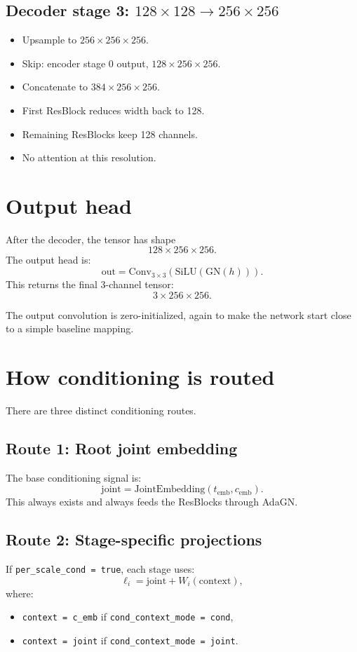 \documentclass[11pt]{article}
\begin{document}
\subsection{Decoder stage 3: $128 \times 128 \to 256 \times 256$}
\begin{itemize}
  \item Upsample to $256 \times 256 \times 256$.
  \item Skip: encoder stage 0 output, $128 \times 256 \times 256$.
  \item Concatenate to $384 \times 256 \times 256$.
  \item First ResBlock reduces width back to 128.
  \item Remaining ResBlocks keep 128 channels.
  \item No attention at this resolution.
\end{itemize}

\section{Output head}
After the decoder, the tensor has shape
\[
128 \times 256 \times 256.
\]
The output head is:
\[
\mathrm{out} = \mathrm{Conv}_{3 \times 3}(\mathrm{SiLU}(\mathrm{GN}(h))).
\]
This returns the final 3-channel tensor:
\[
3 \times 256 \times 256.
\]

The output convolution is zero-initialized, again to make the network start close to a simple baseline mapping.

\section{How conditioning is routed}
There are three distinct conditioning routes.

\subsection{Route 1: Root joint embedding}
The base conditioning signal is:
\[
\mathrm{joint} = \mathrm{JointEmbedding}(t_{\mathrm{emb}}, c_{\mathrm{emb}}).
\]
This always exists and always feeds the ResBlocks through AdaGN.

\subsection{Route 2: Stage-specific projections}
If \texttt{per\_scale\_cond = true}, each stage uses:
\[
\ell_i = \mathrm{joint} + W_i(\text{context}),
\]
where:
\begin{itemize}
  \item \texttt{context = c\_emb} if \texttt{cond\_context\_mode = cond},
  \item \texttt{context = joint} if \texttt{cond\_context\_mode = joint}.
\end{itemize}
\end{document}
